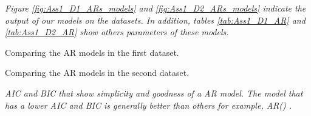 \textit{Figure \ref{fig:Ass1_D1_ARs_models} and \ref{fig:Ass1_D2_ARs_models} indicate the output of our models on the datasets. In addition, tables \ref{tab:Ass1_D1_AR} and \ref{tab:Ass1_D2_AR} show others parameters of these models. }

\begin{table}[H]
\centering
\caption{Comparing the \gls{AR} models in the first dataset.}
\label{tab:Ass1_D1_AR}

\end{table}

\begin{table}[H]
\centering
\caption{Comparing the \gls{AR} models in the second dataset.}
\label{tab:Ass1_D2_AR}

\end{table}







\textit{\Gls{AIC} and \gls{BIC} that show simplicity and goodness of a \gls{AR} model. The model that has a lower \gls{AIC} and \gls{BIC} is generally better than others for example, AR() .}